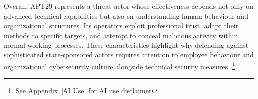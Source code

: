 Overall, APT29 represents a threat actor whose effectiveness depends not only on advanced technical capabilities but also on understanding human behaviour and organizational structures. Its operators exploit professional trust, adapt their methods to specific targets, and attempt to conceal malicious activity within normal working processes. These characteristics highlight why defending against sophisticated state-sponsored actors requires attention to employee behaviour and organizational cybersecurity culture alongside technical security measures. \footnote{See Appendix~\ref{AI Use} for AI use disclaimer}